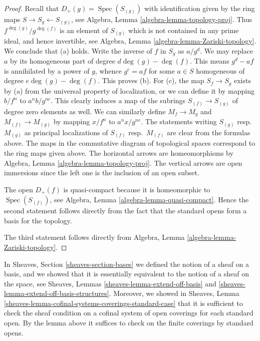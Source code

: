 \documentclass{stacks-project}
\theoremstyle{plain}
\theoremstyle{definition}
\theoremstyle{remark}
\numberwithin{equation}{subsection}
\def\Spec{\mathop{\mathrm{Spec}}}
\begin{document}
\begin{proof}
Recall that $D_{+}(g) = \Spec(S_{(g)})$ with identification
given by the ring maps $S \to S_g \leftarrow S_{(g)}$, see
Algebra, Lemma \ref{algebra-lemma-topology-proj}.
Thus $f^{\deg(g)}/g^{\deg(f)}$ is an element of $S_{(g)}$ which is not
contained in any prime ideal, and hence invertible,
see Algebra, Lemma \ref{algebra-lemma-Zariski-topology}.
We conclude that (a) holds.
Write the inverse of $f$ in $S_g$ as $a/g^d$.
We may replace $a$ by its homogeneous part of degree $d\deg(g) - \deg(f)$.
This means $g^d - af$ is annihilated by a power of $g$, whence
$g^e = af$ for some $a \in S$ homogeneous of degree $e\deg(g) - \deg(f)$.
This proves (b).
For (c), the map $S_f \to S_g$ exists by (a) from the universal property
of localization, or we can define it by mapping $b/f^n$
to $a^nb/g^{ne}$. This clearly induces a map of the subrings
$S_{(f)} \to S_{(g)}$ of degree zero elements as well.
We can similarly define $M_f \to M_g$ and $M_{(f)} \to M_{(g)}$ by mapping
$x/f^n$ to $a^nx/g^{ne}$. The statements writing $S_{(g)}$
resp.\ $M_{(g)}$ as principal localizations of $S_{(f)}$ resp.\ $M_{(f)}$
are clear from the formulas above. The maps in the commutative diagram
of topological spaces correspond to the ring maps given above. The
horizontal arrows are homeomorphisms by
Algebra, Lemma \ref{algebra-lemma-topology-proj}.
The vertical arrows are open immersions since the left
one is the inclusion of an open subset.

\medskip\noindent
The open $D_{+}(f)$ is quasi-compact because it is homeomorphic
to $\Spec(S_{(f)})$, see  Algebra, Lemma \ref{algebra-lemma-quasi-compact}.
Hence the second statement follows directly
from the fact that the standard opens form
a basis for the topology.

\medskip\noindent
The third statement follows directly from
Algebra, Lemma \ref{algebra-lemma-Zariski-topology}.
\end{proof}

\noindent
In Sheaves, Section \ref{sheaves-section-bases} we defined
the notion of a sheaf on a basis, and we showed that it is
essentially equivalent to the notion of a sheaf on the space,
see Sheaves, Lemmas \ref{sheaves-lemma-extend-off-basis} and
\ref{sheaves-lemma-extend-off-basis-structures}. Moreover,
we showed in
Sheaves, Lemma \ref{sheaves-lemma-cofinal-systems-coverings-standard-case}
that it is sufficient to check the sheaf
condition on a cofinal system of open coverings for each
standard open. By the lemma above it suffices to check
on the finite coverings by standard opens.
\end{document}
